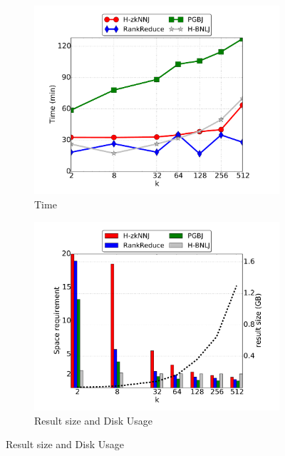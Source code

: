 \begin{figure}[h]
\centering
		\begin{subfigure}[b]{0.3\textwidth}
                 \includegraphics[width=\textwidth]{img-perf/surf/k/time.pdf} 
                \caption{Time\label{fig:surf_k_time} }
                
        \end{subfigure}%
        \begin{subfigure}[b]{0.3\textwidth}
                 \includegraphics[width=\textwidth]{img-perf/surf/k/memory.pdf} 
                \caption{Result size and Disk Usage\label{fig:surf_k_memory}}
                

\end{subfigure}
\end{figure}
